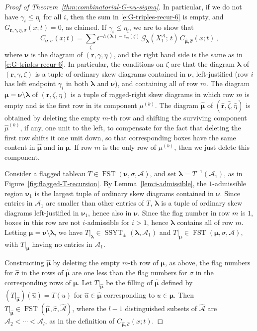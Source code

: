 \documentclass[12pt]{amsart}
\theoremstyle{definition}
\theoremstyle{remark}
\newcommand{\rr}{{\mathbf r}}
\newcommand{\lambold}{{\boldsymbol \lambda }}
\newcommand{\mubold}{{\boldsymbol \mu}}
\newcommand{\nubold}{{\boldsymbol \nu }}
\newcommand{\Acal}{{\mathcal A}}
\newcommand{\Gcal}{{\mathcal G}}
\newcommand{\uhat}{\widehat{u}}
\newcommand{\sigmahat}{\widehat{\sigma }}
\newcommand{\rrhat}{\widehat{\rr }}
\newcommand{\etahat}{\widehat{\eta }}
\newcommand{\zetahat}{\widehat{\zeta }}
\newcommand{\muhat}{\widehat{\mu }}
\newcommand{\muboldhat}{\widehat{\mubold }}
\newcommand{\Acalhat}{\widehat{\Acal  }}
\DeclareMathOperator{\SSYT}{SSYT}
\DeclareMathOperator{\FSST}{FST}
\begin{document}
\begin{proof}[Proof of Theorem~\ref{thm:combinatorial-G-nu-sigma}]
In particular, if we do not have $\gamma _{i}\leq \eta _{i}$ for all
$i$, then the sum in \eqref{e:G-triples-recur-6} is empty, and $G_{\rr
,\gamma ,\eta ,\sigma }(x;t) = 0$, as claimed.
If $\gamma _{i}\leq \eta _{i}$, we are to show that
\begin{equation}\label{e:C-recurrence}
C_{\nubold ,\sigma }(x;t) = \sum _{\zeta } t^{-h(\lambold ) -
e_{m}(\zeta )}\, \Gcal _{\lambold }(X^\Acal_{1};\, t) \, C_{\muboldhat
,\sigmahat }(x;t)\, ,
\end{equation}
where $\nubold $ is the diagram of $(\rr ,\gamma ,\eta )$, and the
right hand side is the same as in \eqref{e:G-triples-recur-6}.  In
particular, the conditions on $\zeta $ are that the diagram $\lambold
$ of $(\rr ,\gamma ,\zeta )$ is a tuple of ordinary skew diagrams
contained in $\nubold $, left-justified (row $i$ has left endpoint
$\gamma _{i}$ in both $\lambold $ and $\nubold $), and containing all
of row $m$.  The diagram $\mubold = \nubold \setminus \lambold $ of
$(\rr ,\zeta ,\eta )$ is a tuple of ragged-right skew diagrams in
which row $m$ is empty and is the first row in its component $\mu
^{(k)}$.  The diagram $\muboldhat $ of $(\rrhat ,\zetahat ,\etahat )$
is obtained by deleting the empty $m$-th row and shifting the
surviving component $\muhat ^{(k)}$, if any, one unit to the left, to
compensate for the fact that deleting the first row shifts it one unit
down, so that corresponding boxes have the same content in $\muboldhat
$ and in $\mubold $.  If row $m$ is the only row of $\mu ^{(k)}$, then
we just delete this component.

Consider a flagged tableau $T\in \FSST (\nubold ,\sigma ,\Acal )$, and
set $\lambold =T^{-1}(\Acal _{1})$, as in
Figure~\ref{fig:flagged-T-recursion}.  By
Lemma~\ref{lem:i-admissible}, the $1$-admissible region $\nubold _{1}
$ is the largest tuple of ordinary skew diagrams contained in $\nubold
$.  Since entries in $\Acal _{1}$ are smaller than other entries of
$T$, $\lambold $ is a tuple of ordinary skew diagrams left-justified
in $\nubold _{1}$, hence also in $\nubold $.  Since the flag number in
row $m$ is $1$, boxes in this row are not $i$-admissible for $i>1$,
hence $\lambold $ contains all of row $m$.  Letting $\mubold =\nubold
\setminus \lambold $, we have $T|_{\lambold } \in \SSYT _{\pm
}(\lambold ,\Acal _{1})$ and $T|_{\mubold} \in \FSST (\mubold , \sigma
,\Acal )$, with $T|_{\mubold }$ having no entries in $\Acal _{1}$.

Constructing $\muboldhat $ by deleting the empty $m$-th row of
$\mubold $, as above, the flag numbers for $\sigmahat $ in the rows of
$\muboldhat $ are one less than the flag numbers for $\sigma $ in the
corresponding rows of $\mubold $.  Let $T|_{\muboldhat }$ be the
filling of $\muboldhat $ defined by $(T|_{\muboldhat })(\uhat ) =
T(u)$ for $\uhat \in \muboldhat $ corresponding to $u\in \mubold$.
Then $T|_{\muboldhat } \in \FSST (\muboldhat , \sigmahat ,\Acalhat )$,
where the $l-1$ distinguished subsets of $\Acalhat $ are $\Acal
_{2}<\cdots <\Acal _{l}$, as in the definition of $C_{\muboldhat
,\sigmahat }(x;t)$.


\end{proof}
\end{document}
